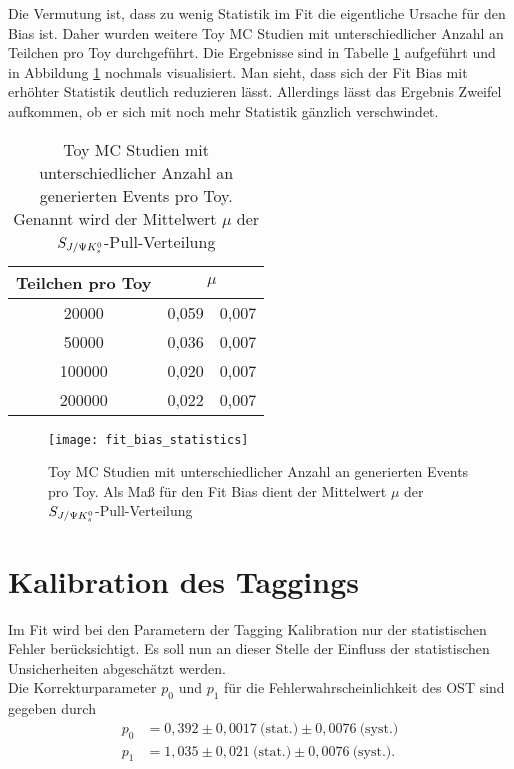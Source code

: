 Die Vermutung ist, dass zu wenig Statistik im Fit die eigentliche Ursache für den Bias ist. Daher wurden weitere Toy MC Studien mit unterschiedlicher Anzahl an Teilchen pro Toy durchgeführt. Die Ergebnisse sind in Tabelle \ref{tab:fit_bias_events} aufgeführt und in Abbildung \ref{fig:fit_bias_events} nochmals visualisiert. Man sieht, dass sich der Fit Bias mit erhöhter Statistik deutlich reduzieren lässt. Allerdings lässt das Ergebnis Zweifel aufkommen, ob er sich mit noch mehr Statistik gänzlich verschwindet.

\begin{table}[hptb]
\centering
\caption{Toy MC Studien mit unterschiedlicher Anzahl an generierten Events pro Toy. Genannt wird der Mittelwert $\mu$ der $S_{J/\Psi K_s^0}$-Pull-Verteilung}
\label{tab:fit_bias_events}
\begin{tabular}{cr@{$\pm$}l}
\hline \hline 
Teilchen pro Toy & \multicolumn{2}{c}{$\mu$}  \\ \hline
20000            &  0,059 & 0,007 \\
50000            &  0,036 & 0,007 \\
100000           &  0,020 & 0,007 \\
200000           &  0,022 & 0,007 \\ 
\hline \hline
\end{tabular}
\end{table}

\begin{figure}[hptb]
\centering
\texttt{[image: fit\_bias\_statistics]}
\caption{Toy MC Studien mit unterschiedlicher Anzahl an generierten Events pro Toy. Als Maß für den Fit Bias dient der Mittelwert $\mu$ der $S_{J/\Psi K_s^0}$-Pull-Verteilung}
\label{fig:fit_bias_events}
\end{figure}

\section{Kalibration des Taggings}
Im Fit wird bei den Parametern der Tagging Kalibration nur der statistischen Fehler berücksichtigt. Es soll nun an dieser Stelle der Einfluss der statistischen Unsicherheiten abgeschätzt werden. \\
Die Korrekturparameter $p_0$ und $p_1$ für die Fehlerwahrscheinlichkeit des \gls{OST} sind gegeben durch
\begin{align}
p_0 &= 0,392 \pm 0,0017\ \text{(stat.)} \pm 0,0076\ \text{(syst.)} \\
p_1 &= 1,035 \pm 0,021\ \text{(stat.)} \pm 0,0076\ \text{(syst.)}.
\end{align}

